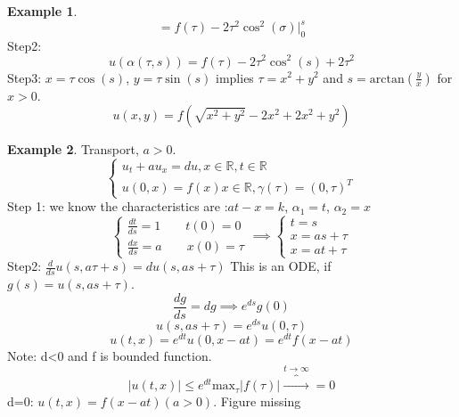\documentclass[a4paper]{article}
\theoremstyle{definition}
\newtheorem{example}{Example}[section]
\begin{document}
\begin{example}
\begin{equation}
		\end{equation} 
		\begin{equation}
			=f\left( \tau \right) -2\tau^2\cos^2\left( \sigma \right) \big|^{s}_{0}
		\end{equation} 
		Step2:
		\begin{equation}
			u\left(\alpha\left( \tau,s \right)   \right) =f\left( \tau \right) -2\tau^2\cos^2\left( s \right) +2\tau^2
		\end{equation} 
		Step3: $x=\tau\cos\left( s \right) $, $y=\tau\sin\left( s \right) $ implies $\tau=x^2+y^2$ and $s=\text{arctan}\left( \frac{y}{x} \right) $ for $x>0$. 
		\begin{equation}
			u\left( x,y \right) =f\left( \sqrt{x^2+y^2} -2x^2+2x^2+y^2 \right) 
		\end{equation} 
	\end{example}
	\begin{example}
		Transport, $a>0$. 
		\begin{equation}
			\begin{cases}
			u_{t}+au_x=du, x\in \mathbb{R}, t\in \mathbb{R}\\
			u\left( 0,x \right) =f\left( x \right) x\in \mathbb{R}, \gamma\left( \tau \right) =\left( 0,\tau \right) ^{T}
			\end{cases}
		\end{equation} 
		Step 1: we know the characteristics are :$at-x=k$, $\alpha_1=t$, $\alpha_2=x$
		\begin{equation}
			\begin{cases}
				\frac{dt}{ds}=1 \qquad t\left( 0 \right) =0\\
				\frac{dx}{ds}=a\qquad x(0)=\tau
			\end{cases}
			\implies \begin{cases}
				t=s\\
				x=as+\tau\\
				x=at+\tau
			\end{cases}
		\end{equation} 
		Step2: $\frac{d}{ds}u\left( s,a\tau+s \right) =du\left( s,as+\tau \right) $
		This is an ODE, if $g\left( s \right) =u\left( s,as+\tau \right) $. 
		\begin{equation}
			\frac{d g}{ds}= d g\implies e^{ds} g\left( 0 \right) 
		\end{equation} 
		\begin{equation}
			u\left( s,as+\tau \right) =e^{ds}u\left( 0,\tau \right) 
		\end{equation} 
		\begin{equation}
			u\left( t,x \right) =e^{dt}u\left( 0,x-at \right) =e^{dt}f\left( x-at \right) 
		\end{equation} 
		Note: d<0 and f is bounded function. 
		\begin{equation}
			\left|u\left( t,x \right)  \right| \le e^{dt} \text{max}_\tau \left|f\left( \tau \right)  \right|\overbrace{\to }^{t\to \infty} =0
		\end{equation} 
		d=0: $u\left( t,x \right) =f\left( x-at \right) \left( a>0 \right) $. 
		Figure missing
	\end{example}
\end{document}
